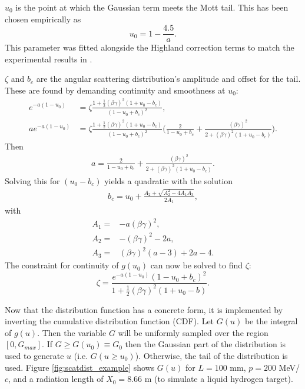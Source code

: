 $u_0$ is the point at which the Gaussian term meets the Mott tail. This has been chosen empirically as
\begin{equation}\label{eqn:cosyu0}
u_0=1-\frac{4.5}{a}.
\end{equation}
This parameter was fitted alongside the Highland correction terms to match the experimental results in \cite{muscat}.

$\zeta$ and $b_c$ are the angular scattering distribution's amplitude and offset for the tail. These are found by demanding continuity and smoothness at $u_0$:
\begin{align*}
e^{-a(1-u_0)}&=\zeta\frac{1+\frac{1}{2}(\beta\gamma)^2(1+u_0-b_c)}{(1-u_0+b_c)^2},\\
ae^{-a(1-u_0)}&=\zeta\frac{1+\frac{1}{2}(\beta\gamma)^2(1+u_0-b_c)}{(1-u_0+b_c)^2} \Big(\frac{2}{1-u_0+b_c}+\frac{(\beta\gamma)^2}{2+(\beta\gamma)^2(1+u_0-b_c)}\Big).
\end{align*}
Then
\begin{align*}
a=\frac{2}{1-u_0+b_c}+\frac{(\beta\gamma)^2}{2+(\beta\gamma)^2(1+u_0-b_c)}.
\end{align*}
Solving this for $(u_0-b_c)$ yields a quadratic with the solution
\begin{align} \label{eqn:cosybc}
b_c=u_0+\frac{A_2 + \sqrt{A_2 ^2 - 4A_1 A_3}}{2A_1},
\end{align}
with
\begin{align*}
A_1=&-a(\beta\gamma)^2,\\
A_2=&-(\beta\gamma)^2-2a,\\
A_3=&(\beta\gamma)^2(a-3)+2a-4.
\end{align*}
The constraint for continuity of $g(u_0)$ can now be solved to find $\zeta$:
\begin{equation}\label{eqn:cosyzeta}
\zeta=\frac{e^{-a(1-u_0)}(1-u_0+b_c)^2}{1+\frac{1}{2}(\beta\gamma)^2(1+u_0-b)}.
\end{equation}

Now that the distribution function has a concrete form, it is implemented by inverting the cumulative distribution function (CDF).  Let $G(u)$ be the integral of $g(u)$. Then the variable $G$ will be uniformly sampled over the region $[0,G_{max}]$. If $G\geq G(u_0) \equiv G_0$ then the Gaussian part of the distribution is used to generate $u$ (i.e. $G(u\geq u_0)$). Otherwise, the tail of the distribution is used. Figure \ref{fig:scatdist_example} shows $G(u)$ for $L=100$ mm, $p=200$ MeV/$c$, and a radiation length of $X_0 = 8.66$ m (to simulate a liquid hydrogen target).

